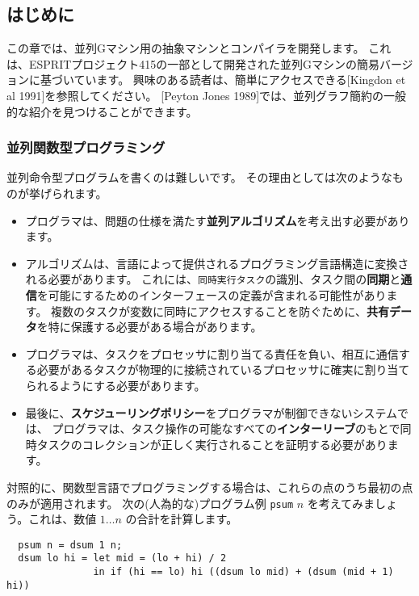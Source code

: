 \documentclass{jarticle}
\begin{document}
\subsection{はじめに}

この章では、並列Gマシン用の抽象マシンとコンパイラを開発します。
これは、ESPRITプロジェクト415の一部として開発された並列Gマシンの簡易バージョンに基づいています。
興味のある読者は、簡単にアクセスできる[Kingdon et al 1991]を参照してください。
[Peyton Jones 1989]では、並列グラフ簡約の一般的な紹介を見つけることができます。

\subsubsection{並列関数型プログラミング}

並列命令型プログラムを書くのは難しいです。 その理由としては次のようなものが挙げられます。

\begin{itemize}
	\item プログラマは、問題の仕様を満たす\textbf{並列アルゴリズム}を考え出す必要があります。
	\item アルゴリズムは、言語によって提供されるプログラミング言語構造に変換される必要があります。
	      これには、\texttt{同時実行タスク}の識別、タスク間の\textbf{同期}と\textbf{通信}を可能にするためのインターフェースの定義が含まれる可能性があります。
	      複数のタスクが変数に同時にアクセスすることを防ぐために、\textbf{共有データ}を特に保護する必要がある場合があります。
	\item プログラマは、タスクをプロセッサに割り当てる責任を負い、相互に通信する必要があるタスクが物理的に接続されているプロセッサに確実に割り当てられるようにする必要があります。
	\item 最後に、\textbf{スケジューリングポリシー}をプログラマが制御できないシステムでは、
	      プログラマは、タスク操作の可能なすべての\textbf{インターリーブ}のもとで同時タスクのコレクションが正しく実行されることを証明する必要があります。
\end{itemize}

対照的に、関数型言語でプログラミングする場合は、これらの点のうち最初の点のみが適用されます。
次の(人為的な)プログラム例 \texttt{psum} $n$ を考えてみましょう。これは、数値 $1 \ldots n$ の合計を計算します。

\begin{verbatim}
  psum n = dsum 1 n;
  dsum lo hi = let mid = (lo + hi) / 2
               in if (hi == lo) hi ((dsum lo mid) + (dsum (mid + 1) hi))
\end{verbatim}
\end{document}

